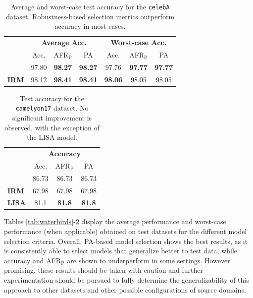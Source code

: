 \begin{table}[H]
    \centering
    \setlength{\tabcolsep}{2.5pt}
    \begin{tabular}{l|ccc|ccc}
    \multirow{3}{*}{} & \multicolumn{3}{c|}{\textbf{Average Acc.}} & \multicolumn{3}{c}{\textbf{Worst-case Acc.}}\\
     & Acc. & AFR$_\text{P}$ & PA & Acc. & AFR$_\text{P}$ & PA \\
    \midrule
    \textbf{{\color{tab:blue} \textbf{ERM}}} & 97.80 & \textbf{98.27} & \textbf{98.27} & 97.76 & \textbf{97.77} & \textbf{97.77}\\
    \textbf{{\color{tab:orange} \textbf{IRM}}} & 98.12 & \textbf{98.41} & \textbf{98.41} & \textbf{98.06} & 98.05 & 98.05 \\
    \bottomrule
    \end{tabular}
    \caption{
        Average and worst-case test accuracy for the \texttt{celebA} \cite{kohWILDSBenchmarkIntheWild2021} dataset. Robustness-based
        selection metrics outperform accuracy in most cases.
    }
    \label{tab:celebA}
\end{table}

\begin{table}[H]
    \centering
    \setlength{\tabcolsep}{2.5pt}
    \begin{tabular}{l|ccc}
    \multirow{3}{*}{} & \multicolumn{3}{c}{\textbf{Accuracy}} \\
     & Acc. & AFR$_\text{P}$ & PA \\
    \midrule
    \textbf{{\color{tab:blue} \textbf{ERM}}} & 86.73 & 86.73 & 86.73 \\
    \textbf{{\color{tab:orange} \textbf{IRM}}} & 67.98 & 67.98 & 67.98 \\
    \textbf{{\color{tab:green} \textbf{LISA}}} & 81.1 & \textbf{81.8} & \textbf{81.8} \\
    \bottomrule
    \end{tabular}
    \caption{
        Test accuracy for the \texttt{camelyon17} \cite{kohWILDSBenchmarkIntheWild2021} dataset.
        No significant improvement is observed, with the exception of the LISA model.
    }
    \label{tab:camelyon17}
    \end{table}

Tables \ref{tab:waterbirds}-\ref{tab:camelyon17} display the average performance and worst-case performance (when 
applicable) obtained on test datasets for the different model selection criteria. Overall, PA-based model selection 
shows the best results, as it is consistently able to select models that generalize better to test data, while 
accuracy and AFR$_\text{P}$ are shown to underperform in some settings. However promising, 
these results should be taken with caution and further experimentation should be pursued to fully determine the 
generalizability of this approach to other datasets and other possible configurations of source domains. \\

 \cleardoublepage